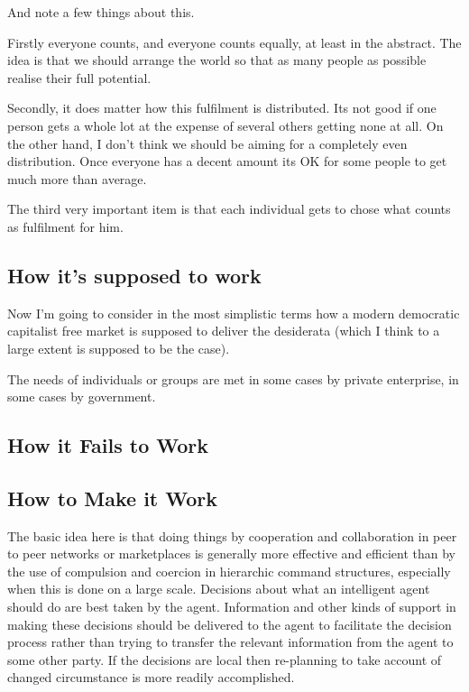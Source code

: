 And note a few things about this.

Firstly everyone counts, and everyone counts equally, at least in the abstract. 
The idea is that we should arrange the world so that as many people as possible realise their full potential.

Secondly, it does matter how this fulfilment is distributed.
Its not good if one person gets a whole lot at the expense of several others getting none at all.
On the other hand, I don't think we should be aiming for a completely even distribution.
Once everyone has a decent amount its OK for some people to get much more than average.

The third very important item is that each individual gets to chose what counts as fulfilment for him.


\subsection{How it's supposed to work}

Now I'm going to consider in the most simplistic terms how a modern democratic capitalist free market is supposed to deliver the desiderata (which I think to a large extent is supposed to be the case).

The needs of individuals or groups are met in some cases by private enterprise, in some cases by government.


\subsection{How it Fails to Work}

\subsection{How to Make it Work}

The basic idea here is that doing things by cooperation and collaboration in peer to peer networks or marketplaces is generally more effective and efficient than by the use of compulsion and coercion in hierarchic command structures, especially when this is done on a large scale.
Decisions about what an intelligent agent should do are best taken by the agent.
Information and other kinds of support in making these decisions should be delivered to the agent to facilitate the decision process rather than trying to transfer the relevant information from the agent to some other party.
If the decisions are local then re-planning to take account of changed circumstance is more readily accomplished.

